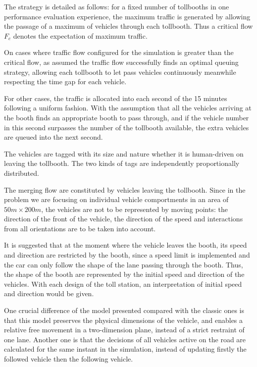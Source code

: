 \documentclass{mcmthesis}
\begin{document}
The strategy is detailed as follows: for a fixed number of tollbooths in one performance evaluation experience, the maximum traffic is generated by allowing the passage of a maximum of vehicles through each tollbooth. Thus a critical flow $F_c$ denotes the expectation of maximum traffic. 

On cases where traffic flow configured for the simulation is greater than the critical flow, as assumed the traffic flow successfully finds an optimal queuing strategy, allowing each tollbooth to let pass vehicles continuously meanwhile respecting the time gap for each vehicle. 

For other cases, the traffic is allocated into each second of the 15 minutes following a uniform fashion. With the assumption that all the vehicles arriving at the booth finds an appropriate booth to pass through, and if the vehicle number in this second surpasses the number of the tollbooth available, the extra vehicles are queued into the next second.

The vehicles are tagged with its size and nature whether it is human-driven on leaving the tollbooth. The two kinds of tags are independently proportionally distributed.

The merging flow are constituted by vehicles leaving the tollbooth. Since in the problem we are focusing on individual vehicle comportments in an area of $50m\times200m$, the vehicles are not to be represented by moving points: the direction of the front of the vehicle, the direction of the speed and interactions from all orientations are to be taken into account.

It is suggested that at the moment where the vehicle leaves the booth, its speed and direction are restricted by the booth, since a speed limit is implemented and the car can only follow the shape of the lane passing through the booth. Thus, the shape of the booth are represented by the initial speed and direction of the vehicles. With each design of the toll station, an interpretation of initial speed and direction would be given.

One crucial difference of the model presented compared with the classic ones is that this model preserves the physical dimensions of the vehicle, and enables a relative free movement in a two-dimension plane, instead of a strict restraint of one lane. Another one is that the decisions of all vehicles active on the road are calculated for the same instant in the simulation, instead of updating firstly the followed vehicle then the following vehicle.
\end{document}
